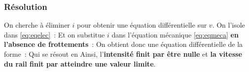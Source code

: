 \documentclass[../main/main.tex]{subfiles}
\begin{document}
\subsubsection{Résolution}
\label{sssec:rlplmot_resol}
On cherche à éliminer $i$ pour obtenir une équation différentielle sur $v$. On
l'isole dans \eqref{eq:eqelec}~:
Et on substitue $i$ dans l'équation mécanique \eqref{eq:eqmeca} \textbf{en
	l'absence de frottements}~:
On obtient donc une équation différentielle de la forme~:
Qui se résout en
Ainsi, l'\textbf{intensité finit par être nulle} et \textbf{la vitesse du rail
	finit par atteindre une valeur limite}.
\end{document}
